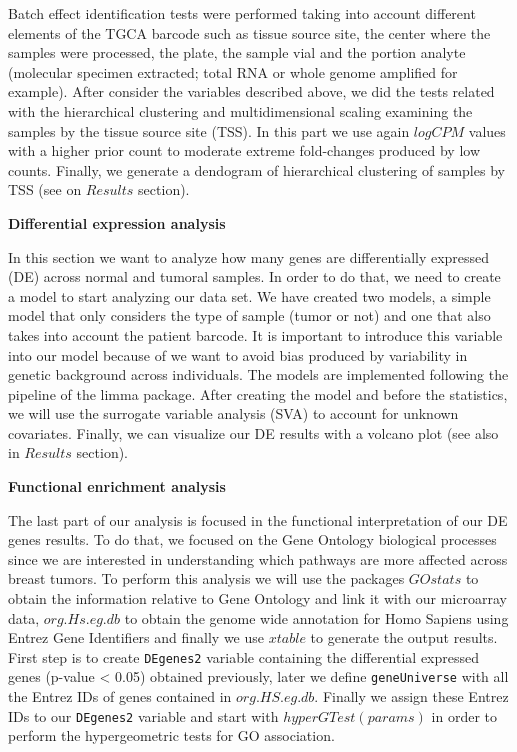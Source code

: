\documentclass[9pt,twocolumn,twoside]{gsajnl}
\begin{document}
Batch effect identification tests were performed taking into account different elements of the TGCA barcode such as tissue source site, the center where the samples were processed, the plate, the sample vial and the portion analyte (molecular specimen extracted; total RNA or whole genome amplified for example). After consider the variables described above, we did the tests related with the hierarchical clustering and multidimensional scaling examining the samples by the tissue source site (TSS). In this part we use again $log CPM$ values with a higher prior count to moderate extreme fold-changes produced by low counts. Finally, we generate a dendogram of hierarchical clustering of samples by TSS (see on $Results$ section). 
\vspace{4mm}

\textbf{Differential expression analysis}
\vspace{2mm}

In this section we want to analyze how many genes are differentially expressed (DE) across normal and tumoral samples. In order to do that, we need to create a model to start analyzing our data set. We have created two models, a simple model that only considers the type of sample (tumor or not) and one that also takes into account the patient barcode. It is important to introduce this variable into our model because of we want to avoid bias produced by variability in genetic background across individuals. The models are implemented following the pipeline of the limma package. After creating the model and before the statistics, we will use the surrogate variable analysis (SVA) to account for unknown covariates. Finally, we can visualize our DE results with a volcano plot (see also in $Results$ section).
\vspace{4mm}

\textbf{Functional enrichment analysis}
\vspace{2mm}

The last part of our analysis is focused in the functional interpretation of our DE genes results. To do that, we focused on the Gene Ontology biological processes since we are interested in understanding which pathways are more affected across breast tumors. To perform this analysis we will use the packages $GOstats$ to obtain the information relative to Gene Ontology and link it with our microarray data, $org.Hs.eg.db$ to obtain the genome wide annotation for Homo Sapiens using Entrez Gene Identifiers and finally we use $xtable$ to generate the output results. First step is to create \verb+DEgenes2+ variable containing the differential expressed genes (p-value < 0.05) obtained previously, later we define \verb+geneUniverse+ with all the Entrez IDs of genes contained in $org.HS.eg.db$. Finally we assign these Entrez IDs to our \verb+DEgenes2+ variable and start with $hyperGTest(params)$ in order to perform the hypergeometric tests for GO association.
\vspace{2mm}
\end{document}
